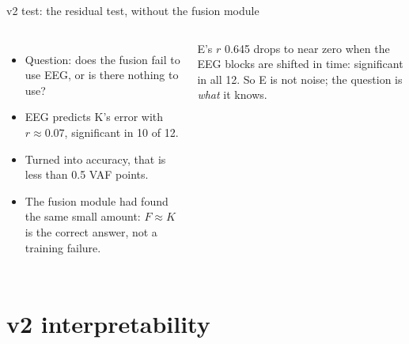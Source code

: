 \documentclass[aspectratio=169,10pt]{beamer}
\begin{document}
\begin{frame}{v2 test: the residual test, without the fusion module}
  \begin{columns}[T]
    \centering
    \begin{itemize}\scriptsize
      \item Question: does the fusion fail to use EEG, or is there nothing to use?
      \item EEG predicts K's error with $r\approx0.07$, significant in 10 of 12.
      \item Turned into accuracy, that is less than 0.5 VAF points.
      \item The fusion module had found the same small amount: $F\approx K$ is the correct answer, not a training
            failure.
    \end{itemize}
    \begin{tcolorbox}[notebox,title={E alone: the time-shift null}]
      E's $r$ 0.645 drops to near zero when the EEG blocks are shifted in time: significant in all 12. So E is not
      noise; the question is \emph{what} it knows.
    \end{tcolorbox}
  \end{columns}
\end{frame}

\section{v2 interpretability}
\end{document}
